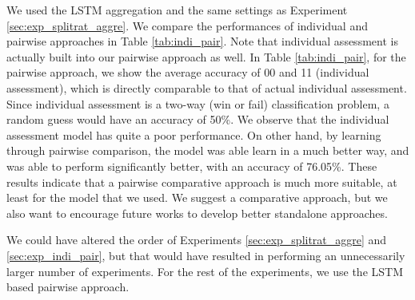 \documentclass[final]{cvpr}
\begin{document}
We used the LSTM aggregation and the same settings as Experiment \ref{sec:exp_splitrat_aggre}. We compare the performances of individual and pairwise approaches in Table \ref{tab:indi_pair}. Note that individual assessment is actually built into our pairwise approach as well. In Table \ref{tab:indi_pair}, for the pairwise approach, we show the average accuracy of 00 and 11 (individual assessment), which is directly comparable to that of actual individual assessment. Since individual assessment is a two-way (win or fail) classification problem, a random guess would have an accuracy of 50\%. We observe that the individual assessment model has quite a poor performance. On other hand, by learning through pairwise comparison, the model was able learn in a much better way, and was able to perform significantly better, with an accuracy of 76.05\%. These results indicate that a pairwise comparative approach is much more suitable, at least for the model that we used. We suggest a comparative approach, but we also want to encourage future works to develop better standalone approaches. 

We could have altered the order of Experiments \ref{sec:exp_splitrat_aggre} and \ref{sec:exp_indi_pair}, but that would have resulted in performing an unnecessarily larger number of experiments. For the rest of the experiments, we use the LSTM based pairwise approach.
\end{document}
